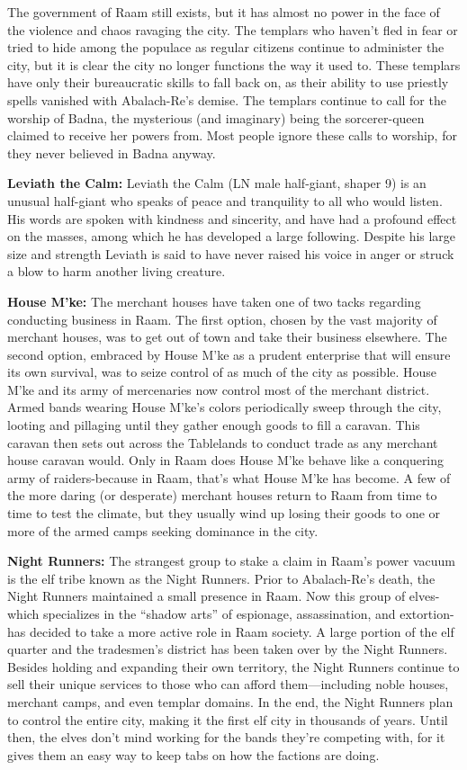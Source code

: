 {
	The government of Raam still exists, but it has almost no power in the face of the violence and chaos ravaging the city. The templars who haven't fled in fear or tried to hide among the populace as regular citizens continue to administer the city, but it is clear the city no longer functions the way it used to. These templars have only their bureaucratic skills to fall back on, as their ability to use priestly spells vanished with Abalach-Re's demise. The templars continue to call for the worship of Badna, the mysterious (and imaginary) being the sorcerer-queen claimed to receive her powers from. Most people ignore these calls to worship, for they never believed in Badna anyway.
}
{
	\textbf{Leviath the Calm:} Leviath the Calm (LN male half-giant, shaper 9) is an unusual half-giant who speaks of peace and tranquility to all who would listen. His words are spoken with kindness and sincerity, and have had a profound effect on the masses, among which he has developed a large following. Despite his large size and strength Leviath is said to have never raised his voice in anger or struck a blow to harm another living creature.

	\textbf{House M'ke:} The merchant houses have taken one of two tacks regarding conducting business in Raam. The first option, chosen by the vast majority of merchant houses, was to get out of town and take their business elsewhere. The second option, embraced by House M'ke as a prudent enterprise that will ensure its own survival, was to seize control of as much of the city as possible. House M'ke and its army of mercenaries now control most of the merchant district. Armed bands wearing House M'ke's colors periodically sweep through the city, looting and pillaging until they gather enough goods to fill a caravan. This caravan then sets out across the Tablelands to conduct trade as any merchant house caravan would. Only in Raam does House M'ke behave like a conquering army of raiders-because in Raam, that's what House M'ke has become. A few of the more daring (or desperate) merchant houses return to Raam from time to time to test the climate, but they usually wind up losing their goods to one or more of the armed camps seeking dominance in the city.

	\textbf{Night Runners:} The strangest group to stake a claim in Raam's power vacuum is the elf tribe known as the Night Runners. Prior to Abalach-Re's death, the Night Runners maintained a small presence in Raam. Now this group of elves-which specializes in the ``shadow arts'' of espionage, assassination, and extortion-has decided to take a more active role in Raam society. A large portion of the elf quarter and the tradesmen's district has been taken over by the Night Runners. Besides holding and expanding their own territory, the Night Runners continue to sell their unique services to those who can afford them---including noble houses, merchant camps, and even templar domains. In the end, the Night Runners plan to control the entire city, making it the first elf city in thousands of years. Until then, the elves don't mind working for the bands they're competing with, for it gives them an easy way to keep tabs on how the factions are doing.

}
